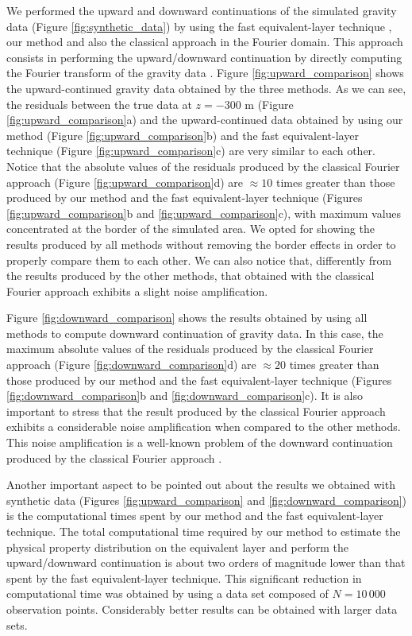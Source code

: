 We performed the upward and downward continuations of the simulated gravity data 
(Figure \ref{fig:synthetic_data}) by using the fast equivalent-layer technique
\citep{siqueira-etal2017}, our method and also the classical approach in the 
Fourier domain. This approach consists in performing the upward/downward continuation 
by directly computing the Fourier transform of the gravity data 
\citep[e.g., ][ p. 317]{blakely1996}.
Figure \ref{fig:upward_comparison} shows the upward-continued gravity data 
obtained by the three methods.
As we can see, the residuals between the true data at $z = -300$ m 
(Figure \ref{fig:upward_comparison}a) and the upward-continued data obtained by 
using our method (Figure \ref{fig:upward_comparison}b) and 
the fast equivalent-layer technique (Figure \ref{fig:upward_comparison}c) are very similar 
to each other.
Notice that the absolute values of the residuals produced by the classical Fourier 
approach (Figure \ref{fig:upward_comparison}d) are $\approx 10$ times greater than
those produced by our method and the fast equivalent-layer technique 
(Figures \ref{fig:upward_comparison}b and \ref{fig:upward_comparison}c), 
with maximum values concentrated at the border of the simulated area.
We opted for showing the results produced by all methods without removing the border 
effects in order to properly compare them to each other.
We can also notice that, differently from the results produced by the other methods, 
that obtained with the classical Fourier approach exhibits a slight noise amplification.

Figure \ref{fig:downward_comparison} shows the results obtained by using all 
methods to compute downward continuation of gravity data.
In this case, the maximum absolute values of the residuals produced by the 
classical Fourier approach (Figure \ref{fig:downward_comparison}d) are 
$\approx 20$ times greater than those produced by our method and the fast equivalent-layer technique (Figures \ref{fig:downward_comparison}b and \ref{fig:downward_comparison}c).
It is also important to stress that the result produced by the classical Fourier approach 
exhibits a considerable noise amplification when compared to the other methods.
This noise amplification is a well-known problem of the downward continuation 
produced by the classical Fourier approach \citep[e.g., ][ p. 320]{blakely1996}.

Another important aspect to be pointed out about the results we obtained with 
synthetic data (Figures \ref{fig:upward_comparison} and \ref{fig:downward_comparison})
is the computational times spent by our method and the fast equivalent-layer technique. 
The total computational time required by our method to estimate the physical property 
distribution on the equivalent layer and perform the upward/downward continuation 
is about two orders of magnitude lower than that spent by the fast equivalent-layer technique.
This significant reduction in computational time was obtained by using a data set 
composed of $N = 10\,000$ observation points. Considerably better results can be 
obtained with larger data sets.

